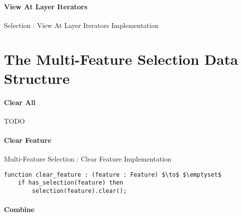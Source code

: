 \newpage

\paragraph{View At Layer Iterators}

\begin{stulisting}[H]
\caption{Selection : View At Layer Iterators Implementation}

\end{stulisting}

\newpage

\section{The Multi-Feature Selection Data Structure}

\paragraph{Clear All}

TODO

\paragraph{Clear Feature}

\begin{stulisting}[H]
\caption{Multi-Feature Selection : Clear Feature Implementation}
\begin{lstlisting}[style=Default]
function clear_feature : (feature : Feature) $\to$ $\emptyset$
	if has_selection(feature) then
		selection(feature).clear();
\end{lstlisting}
\end{stulisting}

\paragraph{Combine}

